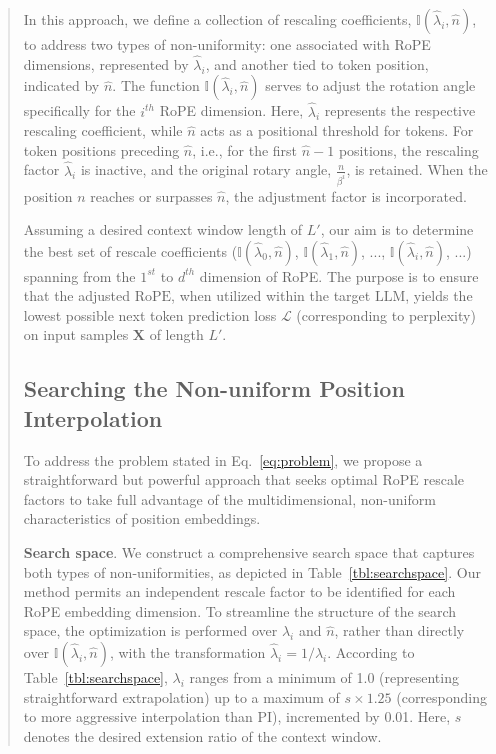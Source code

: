 \begin{abstract}
In this approach, we define a collection of rescaling coefficients, $\mathbb{I}(\hat{\lambda}_{i},\hat{n})$, to address two types of non-uniformity: one associated with RoPE dimensions, represented by $\hat{\lambda}_i$, and another tied to token position, indicated by $\hat{n}$. The function $\mathbb{I}(\hat{\lambda}_{i},\hat{n})$ serves to adjust the rotation angle specifically for the $i^{th}$ RoPE dimension. Here, $\hat\lambda_{i}$ represents the respective rescaling coefficient, while $\hat{n}$ acts as a positional threshold for tokens. For token positions preceding $\hat{n}$, i.e., for the first $\hat{n}-1$ positions, the rescaling factor $\hat\lambda_{i}$ is inactive, and the original rotary angle, $\frac{n}{\beta^i}$, is retained. When the position $n$ reaches or surpasses $\hat{n}$, the adjustment factor is incorporated.

Assuming a desired context window length of $L'$, our aim is to determine the best set of rescale coefficients ($\mathbb{I}(\hat{\lambda}_{0},\hat{n})$, $\mathbb{I}(\hat{\lambda}_{1},\hat{n})$, ..., $\mathbb{I}(\hat{\lambda}_{i},\hat{n})$, ...) spanning from the $1^{st}$ to $d^{th}$ dimension of RoPE. The purpose is to ensure that the adjusted $\text{RoPE}$, when utilized within the target $\text{LLM}$, yields the lowest possible next token prediction loss $\mathcal{L}$ (corresponding to perplexity) on input samples $\mathbf{X}$ of length $L'$.

\subsection{Searching the Non-uniform Position Interpolation}

To address the problem stated in Eq.~\ref{eq:problem}, we propose a straightforward but powerful approach that seeks optimal RoPE rescale factors to take full advantage of the multidimensional, non-uniform characteristics of position embeddings.

\textbf{Search space}. We construct a comprehensive search space that captures both types of non-uniformities, as depicted in Table~\ref{tbl:searchspace}. Our method permits an independent rescale factor to be identified for each RoPE embedding dimension. To streamline the structure of the search space, the optimization is performed over $\lambda_i$ and $\hat{n}$, rather than directly over $\mathbb{I}(\hat{\lambda}_{i},\hat{n})$, with the transformation $\hat{\lambda}_{i}=1/\lambda_i$. According to Table~\ref{tbl:searchspace}, $\lambda_i$ ranges from a minimum of 1.0 (representing straightforward extrapolation) up to a maximum of $s\times1.25$ (corresponding to more aggressive interpolation than PI), incremented by 0.01. Here, $s$ denotes the desired extension ratio of the context window.


\end{abstract}

